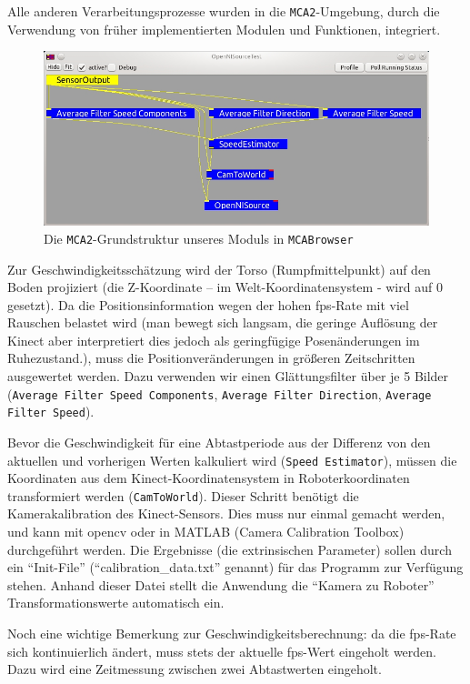 Alle anderen Verarbeitungsprozesse wurden in die \lstinline{MCA2}-Umgebung,
durch die Verwendung von früher implementierten Modulen und Funktionen, integriert.

\begin{figure}[h]
\center
\includegraphics[scale=0.5]{graphics/OpenNISourceTest.jpg}
\caption{\label{fig:OpenNISourceTest} Die \lstinline{MCA2}-Grundstruktur
unseres Moduls in \lstinline{MCABrowser}}
\end{figure}

Zur Geschwindigkeitsschätzung wird der Torso (Rumpfmittelpunkt) auf den Boden projiziert
 (die Z-Koordinate – im Welt-Koordinatensystem - wird auf 0 gesetzt). Da die
 Positionsinformation wegen der hohen \gls{fps}-Rate mit viel Rauschen belastet wird
 (man bewegt sich langsam, die geringe Auflösung der Kinect aber interpretiert
 dies jedoch als geringfügige Posenänderungen im Ruhezustand.), muss die Positionveränderungen
 in größeren Zeitschritten ausgewertet werden. Dazu verwenden wir einen Glättungsfilter über
 je 5 Bilder (\lstinline{Average Filter Speed Components}, \lstinline{Average Filter Direction}, \lstinline{Average Filter Speed}).
 
Bevor die Geschwindigkeit für eine Abtastperiode aus der Differenz von den
aktuellen und vorherigen Werten kalkuliert wird (\lstinline{Speed Estimator}),
müssen die Koordinaten aus dem Kinect-Koordinatensystem in Roboterkoordinaten transformiert werden
 (\lstinline{CamToWorld}). Dieser Schritt benötigt die Kamerakalibration des
 Kinect-Sensors. Dies muss nur einmal gemacht werden, und kann mit \gls{opencv} oder
 in MATLAB (Camera Calibration Toolbox) durchgeführt werden. Die Ergebnisse (die extrinsischen Parameter)
 sollen durch ein ``Init-File'' (``calibration\_data.txt'' genannt) für das
 Programm zur Verfügung stehen.
 Anhand dieser Datei stellt die Anwendung die ``Kamera zu Roboter'' Transformationswerte automatisch ein.
 
Noch eine wichtige Bemerkung zur Geschwindigkeitsberechnung: da die \gls{fps}-Rate
 sich kontinuierlich ändert, muss stets der aktuelle \gls{fps}-Wert eingeholt werden.
 Dazu wird eine Zeitmessung zwischen zwei Abtastwerten eingeholt.

